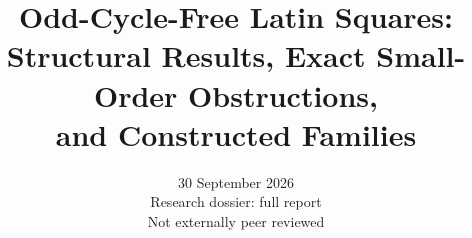\documentclass[11pt]{article}
\title{Odd-Cycle-Free Latin Squares:\\
Structural Results, Exact Small-Order Obstructions,\\
and Constructed Families}
\author{}
\date{30 September 2026\\\small Research dossier: full report\\Not externally peer reviewed}
\begin{document}
\dossierfrontmatter
























\clearpage

\dossierreferences
\end{document}
